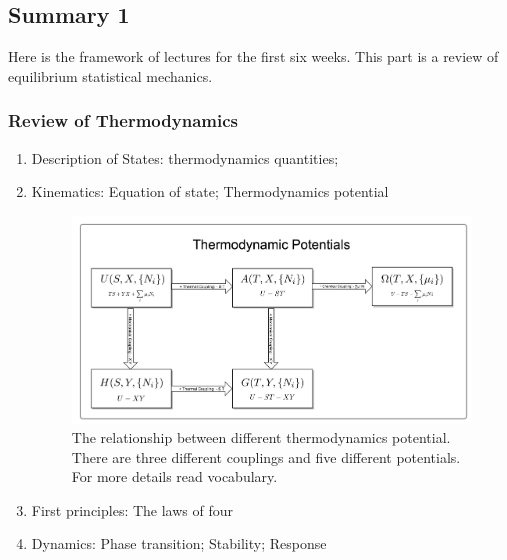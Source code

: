 \documentclass[letterpaper,10pt,english]{sphinxmanual}
\begin{document}
\subsection{Summary 1}
\label{equilibrium/summary1::doc}\label{equilibrium/summary1:summary-1}
Here is the framework of lectures for the first six weeks. This part is a review of equilibrium statistical mechanics.


\subsubsection{Review of Thermodynamics}
\label{equilibrium/summary1:review-of-thermodynamics}\begin{enumerate}
\item {} 
Description of States: thermodynamics quantities;

\item {} 
Kinematics: Equation of state; Thermodynamics potential
\begin{figure}[htbp]
\centering
\capstart

\includegraphics[width=1.000\linewidth]{thermodynamicPotentials.png}
\caption{The relationship between different thermodynamics potential. There are three different couplings and five different potentials. For more details read vocabulary.}\end{figure}

\item {} 
First principles: The laws of four

\item {} 
Dynamics: Phase transition; Stability; Response

\end{enumerate}
\end{document}
